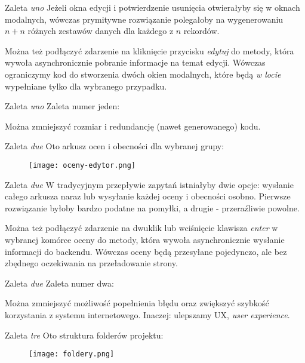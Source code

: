 \begin{frame}{Zaleta \emph{uno}}
	Jeżeli okna edycji i potwierdzenie usunięcia otwierałyby się w oknach modalnych, wówczas prymitywne rozwiązanie polegałoby na wygenerowaniu $n + n$ różnych zestawów danych dla każdego z $n$ rekordów.
	
	Można też podłączyć zdarzenie na kliknięcie przycisku \emph{edytuj} do metody, która wywoła asynchronicznie pobranie informacje na temat edycji. Wówczas ograniczymy kod do stworzenia dwóch okien modalnych, które będą \emph{w locie} wypełniane tylko dla wybranego przypadku.
\end{frame}

\begin{frame}{Zaleta \emph{uno}}
	Zaleta numer jeden:
	
	Można zmniejszyć rozmiar i redundancję (nawet generowanego) kodu.
\end{frame}

\begin{frame}{Zaleta \emph{due}}
	Oto arkusz ocen i obecności dla wybranej grupy:
	\begin{figure}[t]
		\centering
		\texttt{[image: oceny-edytor.png]}
	\end{figure}
\end{frame}

\begin{frame}{Zaleta \emph{due}}
	W tradycyjnym przepływie zapytań istniałyby dwie opcje: wysłanie całego arkusza naraz lub wysyłanie każdej oceny i obecności osobno. Pierwsze rozwiązanie byłoby bardzo podatne na pomyłki, a drugie - przeraźliwie powolne.
	
	Można też podłączyć zdarzenie na dwuklik lub wciśnięcie klawisza \emph{enter} w wybranej komórce oceny do metody, która wywoła asynchronicznie wysłanie informacji do backendu. Wówczas oceny będą przesyłane pojedynczo, ale bez zbędnego oczekiwania na przeładowanie strony.
\end{frame}

\begin{frame}{Zaleta \emph{due}}
	Zaleta numer dwa:
	
	Można zmniejszyć możliwość popełnienia błędu oraz zwiększyć szybkość korzystania z systemu internetowego. Inaczej: ulepszamy UX, \emph{user experience}.
\end{frame}

\begin{frame}{Zaleta \emph{tre}}
	Oto struktura folderów projektu:
	\begin{figure}[t]
		\centering
		\texttt{[image: foldery.png]}
	\end{figure}
\end{frame}

